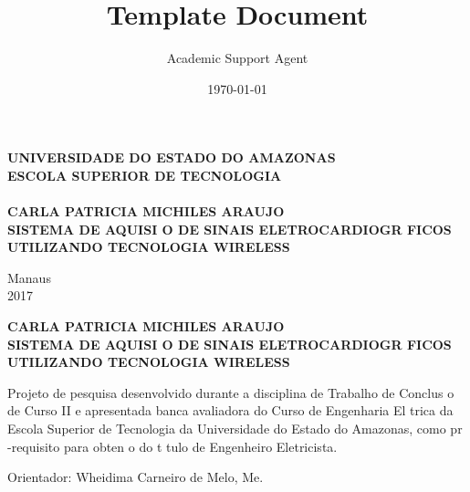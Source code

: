 \documentclass{article}
\title{Template Document}
\author{Academic Support Agent}
\date{\today}
\begin{document}
\maketitle

\thispagestyle{empty}
\begin{center}
\textbf{ UNIVERSIDADE DO ESTADO DO AMAZONAS \\
ESCOLA SUPERIOR DE TECNOLOGIA \\[50pt] }
\textbf{ \\[70pt] {\bigsize CARLA PATRICIA MICHILES ARAUJO} \\[120pt] }
\textbf{ {\bigsize SISTEMA DE AQUISI O DE SINAIS ELETROCARDIOGR FICOS UTILIZANDO TECNOLOGIA WIRELESS}  \\[104pt] }
\end{center}
\hspace*{8cm}

\vspace*{\fill}

\begin{center}
Manaus \\ 2017
\end{center}


\newpage
\thispagestyle{empty}
\begin{center}


\textbf{ {\bigsize CARLA PATRICIA MICHILES ARAUJO} \\[120pt] }
\textbf{ {\bigsize SISTEMA DE AQUISI O DE SINAIS ELETROCARDIOGR FICOS UTILIZANDO TECNOLOGIA WIRELESS}  \\[50pt] }
\end{center}
\hspace*{8cm}
\begin{flushright}
\begin{minipage}{8cm}
\begin{singlespace}
Projeto de pesquisa desenvolvido durante a disciplina de Trabalho de Conclus o de Curso II e apresentada   banca avaliadora do Curso de Engenharia El trica da Escola Superior de Tecnologia da Universidade do Estado do Amazonas, como pr -requisito para obten o do t tulo de Engenheiro Eletricista.\\[50pt]
\end{singlespace}
\end{minipage}
\end{flushright}
\begin{center}
Orientador: Wheidima Carneiro de Melo, Me.

\end{center}
\end{document}
